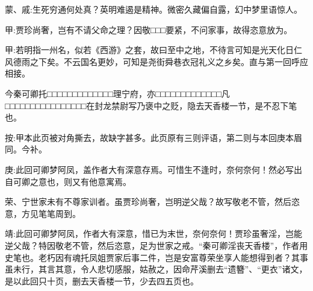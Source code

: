
\begin{parag}
    \begin{note}蒙、戚:生死穷通何处真？英明难遏是精神。微密久藏偏自露，幻中梦里语惊人。\end{note}
\end{parag}


\begin{parag}
    \begin{note}甲:贾珍尚奢，岂有不请父命之理？因敬□□□要紧，不问家事，故得恣意放为。\end{note}
\end{parag}


\begin{parag}
    \begin{note}
        甲:若明指一州名，似若《西游》之套，故曰至中之地，不待言可知是光天化日仁风德雨之下矣。不云国名更妙，可知是尧街舜巷衣冠礼义之乡矣。直与第一回呼应相接。
    \end{note}
\end{parag}


\begin{parag}
    \begin{note}
        今秦可卿托□□□□□□□□□□□□□理宁府，亦□□□□□□□□□□□□□凡□□□□□□□□□□□□□□□□在封龙禁尉写乃褒中之贬，隐去天香楼一节，是不忍下笔也。
    \end{note}
    \begin{subnote}按:甲本此页被对角撕去，故缺字甚多。此页原有三则评语，第二则与本回庚本眉同。今补。\end{subnote}
\end{parag}


\begin{parag}
    \begin{note}
        庚:此回可卿梦阿凤，盖作者大有深意存焉。可惜生不逢时，奈何奈何！然必写出自可卿之意也，则又有他意寓焉。
    \end{note}
\end{parag}


\begin{parag}
    \begin{note}
        荣、宁世家未有不尊家训者。虽贾珍尚奢，岂明逆父哉？故写敬老不管，然后恣意，方见笔笔周到。
    \end{note}
\end{parag}


\begin{parag}
    \begin{note}靖:此回可卿梦阿凤，作者大有深意，惜已为末世，奈何奈何！贾珍虽奢淫，岂能逆父哉？特因敬老不管，然后恣意，足为世家之戒。“秦可卿淫丧天香楼”，作者用史笔也。老朽因有魂托凤姐贾家后事二件，岂是安富尊荣坐享人能想得到者？其事虽未行，其言其意，令人悲切感服，姑赦之，因命芹溪删去“遗簪”、“更衣”诸文，是以此回只十页，删去天香楼一节，少去四五页也。\end{note}
\end{parag}



